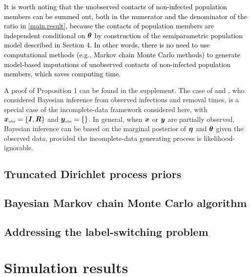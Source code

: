 \documentclass[12pt,usenatbib,referee]{article}
\renewcommand{\alert}{\textcolor{black}}
\begin{document}
\s

\alert{It is worth noting that the unobserved contacts of non-infected population members can be summed out,
both in the numerator and the denominator of the ratio in \eqref{main.result},
because the contacts of population members are independent conditional on $\boldsymbol{\theta}$ by construction of the semiparametric population model described in Section 4.
In other words,
there is no need to use computational methods (e.g., Markov chain Monte Carlo methods) to generate model-based imputations of unobserved contacts of non-infected population members,
which saves computing time.}

A proof of Proposition 1 can be found in the supplement.
The case of \citet{BrNe02} and \citet{GrWeHu10,GrWeHu11},
who considered Bayesian inference from observed infectious and removal times, 
is a special case of the incomplete-data framework considered here, 
with $\bm{x}_{\mbox{\tiny obs}} = \{\bm{I}, \bm{R}\}$ and $\bm{y}_{\mbox{\tiny obs}} = \{\}$.
In general,
when $\bm{x}$ or $\bm{y}$ are partially observed,
Bayesian inference can be based on the marginal posterior of $\boldsymbol{\eta}$ and $\boldsymbol{\theta}$ given the observed data,
provided the incomplete-data generating process is likelihood-ignorable.

\subsection{Truncated Dirichlet process priors}
\label{truncation}

\alert{}

\subsection{Bayesian Markov chain Monte Carlo algorithm}
\label{mmcc}

\alert{}

\subsection{Addressing the label-switching problem}

\alert{}

\section{Simulation results}
\label{simulation.study}

\alert{}
\end{document}
